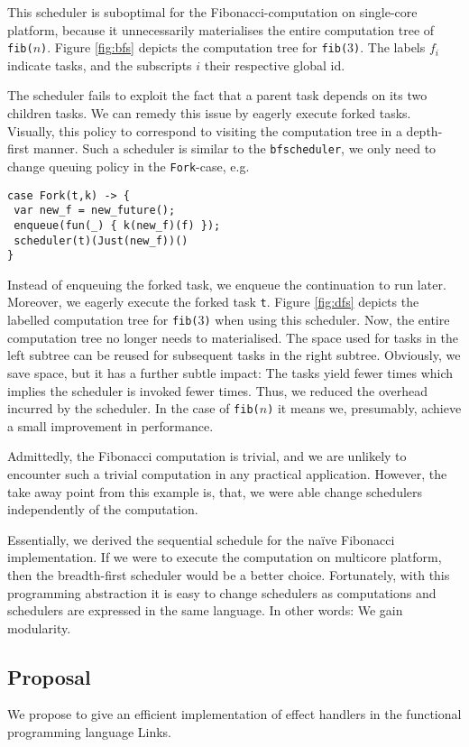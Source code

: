 \documentclass[preprint,10pt,numbers]{sigplanconf}
\begin{document}
This scheduler is suboptimal for the Fibonacci-computation on single-core platform, because it unnecessarily materialises the entire computation tree of \texttt{fib($n$)}. Figure \ref{fig:bfs} depicts the computation tree for \texttt{fib($3$)}. The labels $f_i$ indicate tasks, and the subscripts $i$ their respective global id.

The scheduler fails to exploit the fact that a parent task depends on its two children tasks. We can remedy this issue by eagerly execute forked tasks. Visually, this policy to correspond to visiting the computation tree in a depth-first manner. Such a scheduler is similar to the \texttt{bfscheduler}, we only need to change queuing policy in the \texttt{Fork}-case, e.g.
\begin{lstlisting}[style={links},caption={}]
case Fork(t,k) -> {
 var new_f = new_future();
 enqueue(fun(_) { k(new_f)(f) });
 scheduler(t)(Just(new_f))()
}
\end{lstlisting}
Instead of enqueuing the forked task, we enqueue the continuation to run later. Moreover, we eagerly execute the forked task \texttt{t}.
Figure \ref{fig:dfs} depicts the labelled computation tree for \texttt{fib($3$)} when using this scheduler. Now, the entire computation tree no longer needs to materialised. The space used for tasks in the left subtree can be reused for subsequent tasks in the right subtree. Obviously, we save space, but it has a further subtle impact: The tasks yield fewer times which implies the scheduler is invoked fewer times. Thus, we reduced the overhead incurred by the scheduler. In the case of \texttt{fib($n$)} it means we, presumably, achieve a small improvement in performance.

Admittedly, the Fibonacci computation is trivial, and we are unlikely to encounter such a trivial computation in any practical application. However, the take away point from this example is, that, we were able change schedulers independently of the computation.

Essentially, we derived the sequential schedule for the naïve Fibonacci implementation. If we were to execute the computation on multicore platform, then the breadth-first scheduler would be a better choice. Fortunately, with this programming abstraction it is easy to change schedulers as computations and schedulers are expressed in the same language. In other words: We gain modularity.

\subsection{Proposal}
We propose to give an efficient implementation of effect handlers in the functional programming language Links.
\end{document}
